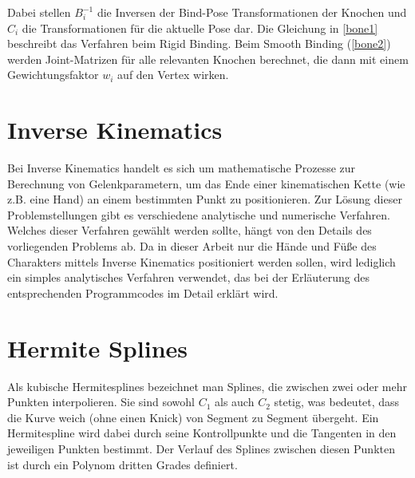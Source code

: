 Dabei stellen $B_{i}^{-1}$ die Inversen der Bind-Pose Transformationen der Knochen und $C_{i}$ die Transformationen für die aktuelle Pose dar. Die Gleichung in \ref{bone1} beschreibt das Verfahren beim Rigid Binding. Beim Smooth Binding (\ref{bone2}) werden Joint-Matrizen für alle relevanten Knochen berechnet, die dann mit einem Gewichtungsfaktor $w_{i}$ auf den Vertex wirken.

\section{Inverse Kinematics}
Bei Inverse Kinematics handelt es sich um mathematische Prozesse zur Berechnung von Gelenkparametern, um das Ende einer kinematischen Kette (wie z.B. eine Hand) an einem bestimmten Punkt zu positionieren. Zur Lösung dieser Problemstellungen gibt es verschiedene analytische und numerische Verfahren. Welches dieser Verfahren gewählt werden sollte, hängt von den Details des vorliegenden Problems ab. Da in dieser Arbeit nur die Hände und Füße des Charakters mittels Inverse Kinematics positioniert werden sollen, wird lediglich ein simples analytisches Verfahren verwendet, das bei der Erläuterung des entsprechenden Programmcodes im Detail erklärt wird.

\section{Hermite Splines}
Als kubische Hermitesplines bezeichnet man Splines, die zwischen zwei oder mehr Punkten interpolieren. Sie sind sowohl $C_1$ als auch $C_2$ stetig, was bedeutet, dass die Kurve weich (ohne einen Knick) von Segment zu Segment übergeht. Ein Hermitespline wird dabei durch seine Kontrollpunkte und die Tangenten in den jeweiligen Punkten bestimmt. Der Verlauf des Splines zwischen diesen Punkten ist durch ein Polynom dritten Grades definiert.